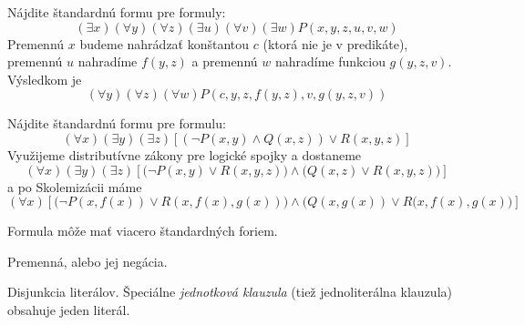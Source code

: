 \begin{priklad}
    Nájdite štandardnú formu pre formuly:
    \begin{equation*}
        (\exists x) (\forall y) (\forall z) (\exists u) (\forall v) (\exists w)
        P(x,y,z,u,v,w)
    \end{equation*}
    Premennú $x$ budeme nahrádzať konštantou $c$ (ktorá nie je v predikáte),
    premennú $u$ nahradíme $f(y,z)$ a
    premennú $w$ nahradíme funkciou $g(y,z,v)$. Výsledkom je
    \begin{equation*}
        (\forall y)(\forall z)(\forall w) P(c,y,z,f(y,z),v,g(y,z,v))
    \end{equation*}
\end{priklad}

\begin{priklad}
    Nájdite štandardnú formu pre formulu:
    \begin{equation*}
        (\forall x)(\exists y) (\exists z) 
        \left[ (\neg P(x,y) \land Q(x,z))\lor R(x,y,z)\right]
    \end{equation*}
    Využijeme distributívne zákony pre logické spojky a dostaneme
    \begin{equation*}
        (\forall x) (\exists y) (\exists z)
        \left[ \Big(\neg P(x,y) \lor R(x,y,z)\Big) \land
            \Big(Q(x,z)\lor R(x,y,z)\Big)\right]
    \end{equation*}
    a po Skolemizácii máme
    \begin{equation*}
        (\forall x) \left[
            \Big(\neg P(x,f(x)) \lor R(x,f(x),g(x)) \Big) \land
            \Big( Q(x,g(x))\lor R(x,f(x),g(x) \Big) \right]
    \end{equation*}
\end{priklad}

\begin{poznamka}
    Formula môže mať viacero štandardných foriem.
\end{poznamka}




\begin{definicia}[Literál]
    Premenná, alebo jej negácia.
\end{definicia}

\begin{definicia}[Klauzula]
    Disjunkcia literálov.
    Špeciálne \emph{jednotková klauzula} (tiež jednoliterálna klauzula)
    obsahuje jeden literál. 
\end{definicia}

